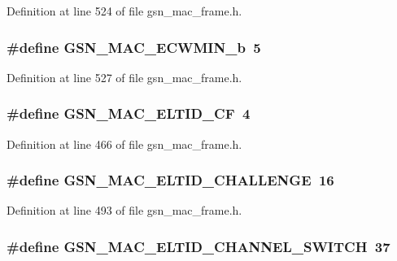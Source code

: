 Definition at line 524 of file gsn\_\-mac\_\-frame.h.

\hypertarget{a00523_a8d1ff390802f250fa0952bcf1a9f7e82}{
\subsubsection[{GSN\_\-MAC\_\-ECWMIN\_\-b}]{\setlength{\rightskip}{0pt plus 5cm}\#define GSN\_\-MAC\_\-ECWMIN\_\-b~5}}
\label{a00523_a8d1ff390802f250fa0952bcf1a9f7e82}


Definition at line 527 of file gsn\_\-mac\_\-frame.h.

\hypertarget{a00523_a1a6e47e5e3532688addff1fc1295e1b2}{
\subsubsection[{GSN\_\-MAC\_\-ELTID\_\-CF}]{\setlength{\rightskip}{0pt plus 5cm}\#define GSN\_\-MAC\_\-ELTID\_\-CF~4}}
\label{a00523_a1a6e47e5e3532688addff1fc1295e1b2}


Definition at line 466 of file gsn\_\-mac\_\-frame.h.

\hypertarget{a00523_a9c9233f2e4a71bc0fe46b84b02789edf}{
\subsubsection[{GSN\_\-MAC\_\-ELTID\_\-CHALLENGE}]{\setlength{\rightskip}{0pt plus 5cm}\#define GSN\_\-MAC\_\-ELTID\_\-CHALLENGE~16}}
\label{a00523_a9c9233f2e4a71bc0fe46b84b02789edf}


Definition at line 493 of file gsn\_\-mac\_\-frame.h.

\hypertarget{a00523_aa9647b9b328ea5d3648960becda5d548}{
\subsubsection[{GSN\_\-MAC\_\-ELTID\_\-CHANNEL\_\-SWITCH}]{\setlength{\rightskip}{0pt plus 5cm}\#define GSN\_\-MAC\_\-ELTID\_\-CHANNEL\_\-SWITCH~37}}
\label{a00523_aa9647b9b328ea5d3648960becda5d548}


